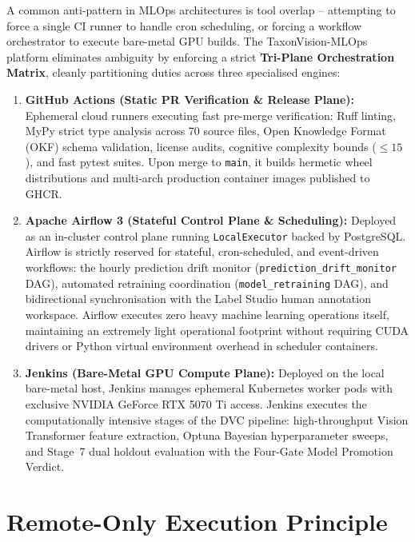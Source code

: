 A common anti-pattern in MLOps architectures is tool overlap -- attempting to force a single CI runner to handle cron scheduling, or forcing a workflow orchestrator to execute bare-metal GPU builds. The TaxonVision-MLOps platform eliminates ambiguity by enforcing a strict \textbf{Tri-Plane Orchestration Matrix}, cleanly partitioning duties across three specialised engines:
\begin{enumerate}
    \item \textbf{GitHub Actions (Static PR Verification \& Release Plane):} Ephemeral cloud runners executing fast pre-merge verification: Ruff linting, MyPy strict type analysis across 70 source files, Open Knowledge Format (OKF) schema validation, license audits, cognitive complexity bounds ($\le 15$), and fast pytest suites. Upon merge to \texttt{main}, it builds hermetic wheel distributions and multi-arch production container images published to GHCR.
    \item \textbf{Apache Airflow 3 (Stateful Control Plane \& Scheduling):} Deployed as an in-cluster control plane running \texttt{LocalExecutor} backed by PostgreSQL. Airflow is strictly reserved for stateful, cron-scheduled, and event-driven workflows: the hourly prediction drift monitor (\texttt{prediction\_drift\_monitor} DAG), automated retraining coordination (\texttt{model\_retraining} DAG), and bidirectional synchronisation with the Label Studio human annotation workspace. Airflow executes zero heavy machine learning operations itself, maintaining an extremely light operational footprint without requiring CUDA drivers or Python virtual environment overhead in scheduler containers.
    \item \textbf{Jenkins (Bare-Metal GPU Compute Plane):} Deployed on the local bare-metal host, Jenkins manages ephemeral Kubernetes worker pods with exclusive NVIDIA GeForce RTX 5070 Ti access. Jenkins executes the computationally intensive stages of the DVC pipeline: high-throughput Vision Transformer feature extraction, Optuna Bayesian hyperparameter sweeps, and Stage~7 dual holdout evaluation with the Four-Gate Model Promotion Verdict.
\end{enumerate}

\section{Remote-Only Execution Principle}
\label{sec:remote_only}

